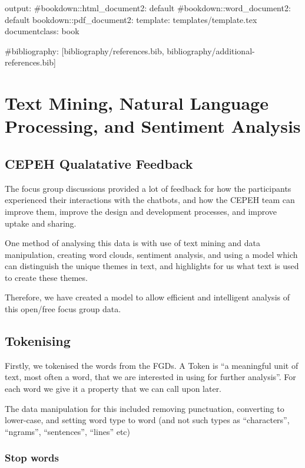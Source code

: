 \documentclass[a4paper, nobind]{templates/ociamthesis}
\begin{document}
output:
\#bookdown::html\_document2: default
\#bookdown::word\_document2: default
bookdown::pdf\_document2:
template: templates/template.tex
documentclass: book

\#bibliography: {[}bibliography/references.bib, bibliography/additional-references.bib{]}

\hypertarget{text-mining-natural-language-processing-and-sentiment-analysis}{%
\chapter{Text Mining, Natural Language Processing, and Sentiment Analysis}\label{text-mining-natural-language-processing-and-sentiment-analysis}}

\hypertarget{cepeh-qualatative-feedback}{%
\section{CEPEH Qualatative Feedback}\label{cepeh-qualatative-feedback}}

The focus group discussions provided a lot of feedback for how the participants experienced their interactions with the chatbots, and how the CEPEH team can improve them, improve the design and development processes, and improve uptake and sharing.

One method of analysing this data is with use of text mining and data manipulation, creating word clouds, sentiment analysis, and using a model which can distinguish the unique themes in text, and highlights for us what text is used to create these themes.

Therefore, we have created a model to allow efficient and intelligent analysis of this open/free focus group data.

\hypertarget{tokenising}{%
\section{Tokenising}\label{tokenising}}

Firstly, we tokenised the words from the FGDs. A Token is ``a meaningful unit of text, most often a word, that we are interested in using for further analysis''. For each word we give it a property that we can call upon later.

The data manipulation for this included removing punctuation, converting to lower-case, and setting word type to word (and not such types as ``characters'', ``ngrams'', ``sentences'', ``lines'' etc)

\hypertarget{stop-words}{%
\subsection{Stop words}\label{stop-words}}
\end{document}
